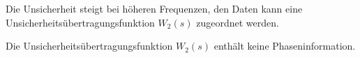 \begin{enumerate}
                        Die Unsicherheit steigt bei höheren Frequenzen, den Daten kann eine Unsicherheitsübertragungsfunktion $W_2(s)$ zugeordnet werden.
                        
                        Die Unsicherheitsübertragungsfunktion $W_2(s)$ enthält keine Phaseninformation.
                        

                    \end{enumerate}
                    
                    
